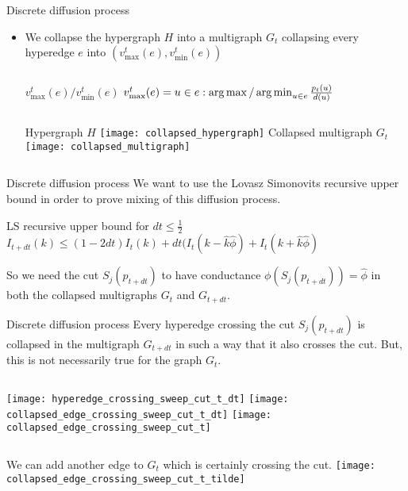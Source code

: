 \documentclass[../main.tex]{subfiles}
\begin{document}
	\begin{frame}{Discrete diffusion process}
		\begin{itemize}
			\item We collapse the hypergraph $H$ into a multigraph $G_t$ collapsing every hyperedge $e$ into $(v_{\text{max}}^t(e), v_{\text{min}}^t(e))$
				\begin{columns}
					\begin{block}{$v_{\text{max}}^t(e)/ v_{\text{min}}^t(e)$}
						$v_{\text{max}}^t(e) = u\in e : \operatorname*{arg\,max}/\operatorname*{arg\,min}_{u\in e} \frac{p_t(u)}{d(u)}$
					\end{block}
				\end{columns}
			\begin{columns}
				\hspace{1cm}\column{0.5\textwidth}
					Hypergraph $H$
					\hspace{2cm}\texttt{[image: collapsed\_hypergraph]}
				\column{0.5\textwidth}
					Collapsed multigraph $G_t$
				\texttt{[image: collapsed\_multigraph]}
			\end{columns}
		\end{itemize}
	\end{frame}

	\begin{frame}{Discrete diffusion process}
		We want to use the Lovasz Simonovits recursive upper bound in order to prove mixing of this diffusion process.
		\begin{block}{LS recursive upper bound for $dt\leq \frac{1}{2}$}
			$I_{t+dt}(k) \leq (1-2dt)I_t(k) + dt(I_t(k - \hat{k}\hat{\phi}) + I_t(k + \hat{k}\hat{\phi})$
		\end{block}
		So we need the cut $S_j(p_{t+dt})$ to have conductance $\phi(S_j(p_{t+dt})) = \hat{\phi}$ in both the collapsed multigraphs $G_t$ and $G_{t+dt}$.
	\end{frame}
	\begin{frame}{Discrete diffusion process}
		Every hyperedge crossing the cut $S_j(p_{t+dt})$ is collapsed in the multigraph $G_{t+dt}$ in such a way that it also crosses the cut. But, this is not necessarily true for the graph $G_t$.
		\begin{columns}
			\column{0.33\textwidth}
				\texttt{[image: hyperedge\_crossing\_sweep\_cut\_t\_dt]}
			\column{0.33\textwidth}
				\texttt{[image: collapsed\_edge\_crossing\_sweep\_cut\_t\_dt]}
			\column{0.33\textwidth}
			\texttt{[image: collapsed\_edge\_crossing\_sweep\_cut\_t]}
		\end{columns}
		\begin{columns}
			We can add another edge to $G_t$ which is certainly crossing the cut.
			\texttt{[image: collapsed\_edge\_crossing\_sweep\_cut\_t\_tilde]}
		\end{columns}
		
	\end{frame}
\end{document}
